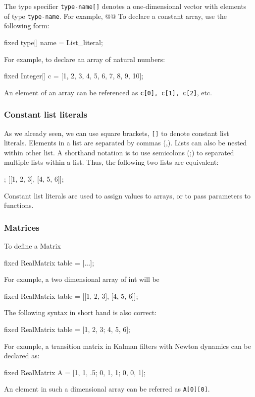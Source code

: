 \documentclass[12pt]{article}
\begin{document}
The \bl type specifier \verb|type-name[]| denotes
a one-dimensional vector with elements of type {\tt type-name}.
For example, @@
To declare a constant array, use the following form:
\begin{blogcode}
fixed type[] name = List_literal;
\end{blogcode}

For example, to declare an array of natural numbers:
\begin{blogcode}
fixed Integer[] c = [1, 2, 3, 4, 5, 6, 7, 8, 9, 10];
\end{blogcode}

An element of an array can be referenced as \verb|c[0], c[1], c[2]|, etc.

\subsubsection{Constant list literals}\label{list-literal-section}
As we already seen, we can use square brackets, \texttt{[]} to denote constant list literals.
Elements in a list are separated by commas (,). Lists can also be nested within other list. A shorthand notation is to use semicolons (;) to separated multiple lists within a list.
Thus, the following two lists are equivalent:
\begin{blogcode}
[1, 2, 3; 4, 5, 6];
[[1, 2, 3], [4, 5, 6]];
\end{blogcode}

Constant list literals are used to assign values to arrays, or to pass parameters to functions.

\subsubsection{Matrices}\label{matrix-section}
To define a Matrix
\begin{blogcode}
fixed RealMatrix table = [...];
\end{blogcode}

For example, a two dimensional array of int will be
\begin{blogcode}
fixed RealMatrix table = [[1, 2, 3], [4, 5, 6]];
\end{blogcode}
The following syntax in short hand is also correct:
\begin{blogcode}
fixed RealMatrix table = [1, 2, 3; 4, 5, 6];
\end{blogcode}


For example, a transition matrix in Kalman  filters with Newton dynamics can be declared as:
\begin{blogcode}
fixed RealMatrix A = [1, 1, .5; 0, 1, 1; 0, 0, 1];
\end{blogcode}
An element in such a dimensional array can be referred as \texttt{A[0][0]}.
\end{document}
